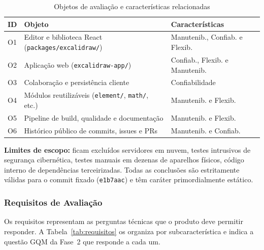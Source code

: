 \documentclass[12pt]{article}
\begin{document}
\begin{table}[!ht]
\centering
\caption{Objetos de avaliação e características relacionadas}
\label{tab:objetos}
\vspace{4pt}
\footnotesize
\begin{tabular}{p{0.8cm}p{9.0cm}p{5.7cm}}
\toprule
\textbf{ID} & \textbf{Objeto} & \textbf{Características} \\
\midrule
O1 & Editor e biblioteca React (\texttt{packages/excalidraw/}) & Manutenib., Confiab. e Flexib. \\
O2 & Aplicação web (\texttt{excalidraw-app/}) & Confiab., Flexib. e Manutenib. \\
O3 & Colaboração e persistência cliente & Confiabilidade \\
O4 & Módulos reutilizáveis (\texttt{element/}, \texttt{math/}, etc.) & Manutenib. e Flexib. \\
O5 & Pipeline de build, qualidade e documentação & Manutenib. e Flexib. \\
O6 & Histórico público de commits, issues e PRs & Manutenib. e Confiab. \\
\bottomrule
\end{tabular}
\end{table}

\textbf{Limites de escopo:} ficam excluídos servidores em nuvem, testes intrusivos de segurança cibernética, testes manuais em dezenas de aparelhos físicos, código interno de dependências terceirizadas. Todas as conclusões são estritamente válidas para o commit fixado (\texttt{e1b7aac}) e têm caráter primordialmente estático.

\subsubsection{Requisitos de Avaliação}
\label{subsec:requisitos}

Os requisitos representam as perguntas técnicas que o produto deve permitir responder. A Tabela~\ref{tab:requisitos} os organiza por subcaracterística e indica a questão GQM da Fase~2 que responde a cada um.
\end{document}
